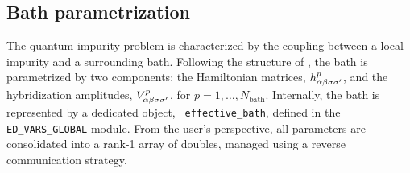 \documentclass[edipack_sp.tex]{subfiles}
\begin{document}




















\subsection{Bath parametrization}\label{sSecBath}
The quantum impurity problem is characterized by the coupling between
a local impurity and a surrounding bath. Following the structure of
, the bath is parametrized by two components: the
Hamiltonian matrices, $h_{\alpha\beta\sigma\sigma'}^p$, and the hybridization amplitudes,
$V_{\alpha\beta\sigma\sigma'}^p$, for $p = 1, \dots, N_\mathrm{bath}$.
Internally, the bath is represented by a dedicated object, {\tt
  effective\_bath}, defined in the {\tt ED\_VARS\_GLOBAL} module. From
the user's perspective, all parameters are consolidated into a rank-1
array of doubles, managed using a reverse communication strategy. 
\end{document}
